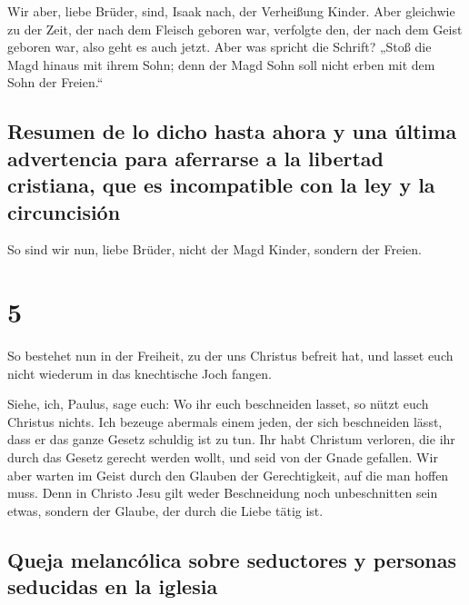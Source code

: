  Wir aber, liebe Brüder, sind, Isaak nach, der Verheißung
Kinder.  Aber gleichwie zu der Zeit, der nach dem Fleisch
geboren war, verfolgte den, der nach dem Geist geboren war, also geht es
auch jetzt.  Aber was spricht die Schrift? „Stoß die Magd
hinaus mit ihrem Sohn; denn der Magd Sohn soll nicht erben mit dem Sohn
der Freien.``

\hypertarget{resumen-de-lo-dicho-hasta-ahora-y-una-uxfaltima-advertencia-para-aferrarse-a-la-libertad-cristiana-que-es-incompatible-con-la-ley-y-la-circuncisiuxf3n}{%
\subsection{Resumen de lo dicho hasta ahora y una última advertencia
para aferrarse a la libertad cristiana, que es incompatible con la ley y
la
circuncisión}\label{resumen-de-lo-dicho-hasta-ahora-y-una-uxfaltima-advertencia-para-aferrarse-a-la-libertad-cristiana-que-es-incompatible-con-la-ley-y-la-circuncisiuxf3n}}

 So sind wir nun, liebe Brüder, nicht der Magd Kinder,
sondern der Freien.

\hypertarget{section-4}{%
\section{5}\label{section-4}}

 So bestehet nun in der Freiheit, zu der uns Christus
befreit hat, und lasset euch nicht wiederum in das knechtische Joch
fangen.

 Siehe, ich, Paulus, sage euch: Wo ihr euch beschneiden
lasset, so nützt euch Christus nichts.  Ich bezeuge
abermals einem jeden, der sich beschneiden lässt, dass er das ganze
Gesetz schuldig ist zu tun.  Ihr habt Christum verloren,
die ihr durch das Gesetz gerecht werden wollt, und seid von der Gnade
gefallen.  Wir aber warten im Geist durch den Glauben der
Gerechtigkeit, auf die man hoffen muss.  Denn in Christo
Jesu gilt weder Beschneidung noch unbeschnitten sein etwas, sondern der
Glaube, der durch die Liebe tätig ist.

\hypertarget{queja-melancuxf3lica-sobre-seductores-y-personas-seducidas-en-la-iglesia}{%
\subsection{Queja melancólica sobre seductores y personas seducidas en
la
iglesia}\label{queja-melancuxf3lica-sobre-seductores-y-personas-seducidas-en-la-iglesia}}

